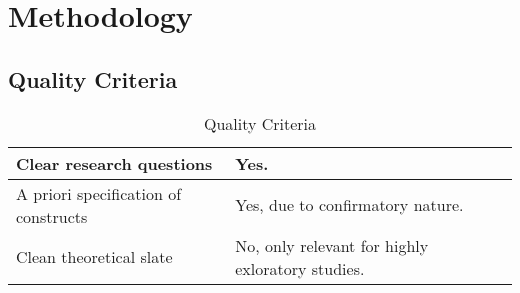 \chapter{Methodology}
\section{Quality Criteria}

\begin{table}[htbp]
\caption{Quality Criteria}
\begin{tabular}{|l|p{}|}
\hline
Clear  research  questions  &  Yes.\\ \hline
A priori  specification  of constructs &  Yes, due to confirmatory nature.\\ \hline
Clean  theoretical  slate &  No, only relevant for highly exloratory studies.\\ \hline
\end{tabular}
\label{tab:methodology}
\end{table}